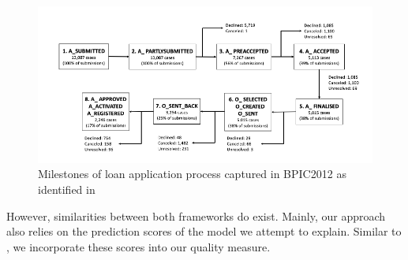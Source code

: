 \documentclass[./../../paper.tex]{subfiles}
\begin{document}
\begin{figure}[htbp]
    \centering
    \includegraphics[width=\textwidth]{figures/milestones.png}
    \caption{Milestones of loan application process captured in BPIC2012 as
    identified in \autocite{bautista_ProcessMiningDrivenOptimization_2012}}
    \label{fig:milestones}
\end{figure}

However, similarities between both frameworks do exist. Mainly, our approach also relies on the prediction scores of the model we attempt to explain. Similar to \citeauthor{hsieh_DiCE4ELInterpretingProcess_2021}, we incorporate these scores into our quality measure. 

\end{document}
